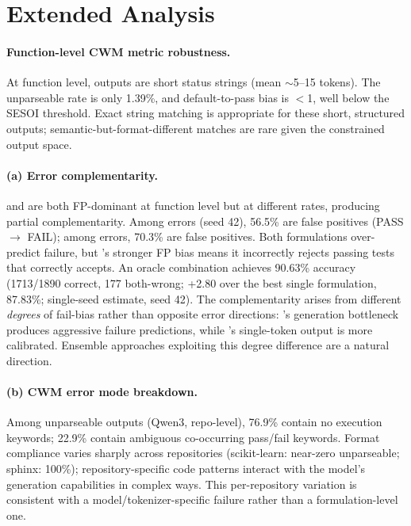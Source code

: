 \section{Extended Analysis}
\label{app:extended_analysis}

\paragraph{Function-level CWM metric robustness.}
At function level, \cwm{} outputs are short status strings (mean ${\sim}$5--15 tokens). The unparseable rate is only 1.39\%, and default-to-pass bias is $<$1\pp{}, well below the SESOI threshold. Exact string matching is appropriate for these short, structured outputs; semantic-but-format-different matches are rare given the constrained output space.

\paragraph{(a) Error complementarity.}
\cls{} and \cwm{} are both FP-dominant at function level but at different rates, producing partial complementarity. Among \cls{} errors (seed 42), 56.5\% are false positives (PASS $\to$ FAIL); among \cwm{} errors, 70.3\% are false positives. Both formulations over-predict failure, but \cwm{}'s stronger FP bias means it incorrectly rejects passing tests that \cls{} correctly accepts. An oracle combination achieves 90.63\% accuracy (1713/1890 correct, 177 both-wrong; +2.80\pp{} over the best single formulation, \cls{} 87.83\%; single-seed estimate, seed 42). The complementarity arises from different \emph{degrees} of fail-bias rather than opposite error directions: \cwm{}'s generation bottleneck produces aggressive failure predictions, while \cls{}'s single-token output is more calibrated. Ensemble approaches exploiting this degree difference are a natural direction.

\paragraph{(b) CWM error mode breakdown.}
Among unparseable \cwm{} outputs (Qwen3, repo-level), 76.9\% contain no execution keywords; 22.9\% contain ambiguous co-occurring pass/fail keywords. Format compliance varies sharply across repositories (scikit-learn: near-zero unparseable; sphinx: 100\%); repository-specific code patterns interact with the model's generation capabilities in complex ways. This per-repository variation is consistent with a model/tokenizer-specific failure rather than a formulation-level one.

